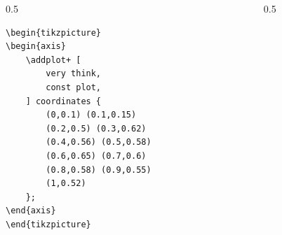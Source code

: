 \documentclass[12pt,aspectratio=169,ignorenonframetext]{ltxbeamer}
\begin{document}
\begin{frame}[fragile]
\bigskip

\begin{columns}
    \begin{column}{0.5\textwidth}
        \begin{verbatim}
\begin{tikzpicture}
\begin{axis}
    \addplot+ [
        very think,
        const plot,
    ] coordinates {
        (0,0.1) (0.1,0.15)
        (0.2,0.5) (0.3,0.62)
        (0.4,0.56) (0.5,0.58)
        (0.6,0.65) (0.7,0.6)
        (0.8,0.58) (0.9,0.55)
        (1,0.52)
    };
\end{axis}
\end{tikzpicture}
        \end{verbatim}
    \end{column}
    {\color{gray} \vline}
    \begin{column}{0.5\textwidth}
    \end{column}
\end{columns}
\end{frame}
\end{document}

